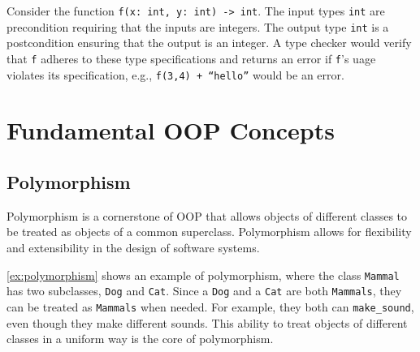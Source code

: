 \documentclass[oneside,11pt,dvipsnames]{book}
\newcommand{\code}[1]{\texttt{#1}}
\begin{document}
Consider the function \code{f(x: int, y: int) -> int}. The input types \code{int} are precondition requiring that the inputs are integers. The output type \code{int} is a postcondition ensuring that the output is an integer. A type checker would verify that \code{f} adheres to these type specifications and returns an error if \code{f}'s uage violates its specification, e.g., \code{f(3,4) + ``hello''} would be an error.


\section{Fundamental OOP Concepts}\label{sec:fundamental-oop-concepts}

\subsection{Polymorphism} Polymorphism is a cornerstone of OOP that allows objects of different classes to be treated as objects of a common superclass.  
Polymorphism allows for flexibility and extensibility in the design of software systems.


\autoref{ex:polymorphism} shows an example of polymorphism, where the class \code{Mammal} has two subclasses, \code{Dog} and \code{Cat}. 
Since a \code{Dog} and a \code{Cat} are both \code{Mammals}, they can be treated as \code{Mammals} when needed. For example, they both can \code{make\_sound}, even though they make different sounds. This ability to treat objects of different classes in a uniform way is the core of polymorphism.
\end{document}
